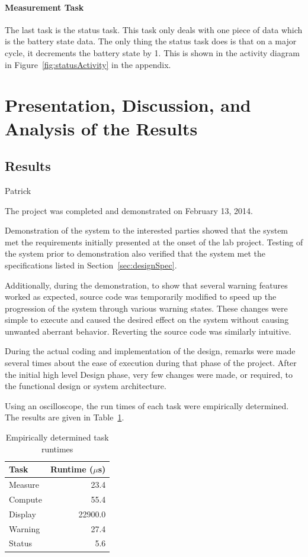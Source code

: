 \documentclass[12pt]{article} %
\begin{document}
    \paragraph{Measurement Task}
    The last task is the status task. This task only deals with one piece of data
    which is the battery state data. The only thing the status task does is that on
    a major cycle, it decrements the battery state by 1. This is shown in the
    activity diagram in Figure~\ref{fig:statusActivity} in the appendix.

    \section{Presentation, Discussion, and Analysis of the Results}

    \subsection{Results} Patrick

    The project was completed and demonstrated on February 13, 2014.

    Demonstration of the system to the interested parties showed that the
    system met the requirements initially presented at the onset of the lab
    project.  Testing of the system prior to demonstration also verified that
    the system met the specifications listed in Section~\ref{sec:designSpec}.

    Additionally, during the demonstration, to show that several warning
    features worked as expected, source code was temporarily modified to speed
    up the progression of the system through various warning states. These
    changes were simple to execute and caused the desired effect on the system
    without causing unwanted aberrant behavior. Reverting the source code was
    similarly intuitive.

    During the actual coding and implementation of the design, remarks were
    made several times about the ease of execution during that phase of the
    project. After the initial high level Design phase, very few changes were
    made, or required, to the functional design or system architecture.

    Using an oscilloscope, the run times of each task were empirically
    determined. The results are given in Table~\ref{tab:taskRuntimes}.

    \begin{table}[h]
      \centering
      \begin{tabular}{|l|r|} 
	\hline
	Task & Runtime ($\mu$s) \\ \hline
	Measure & 23.4 \\ \hline
	Compute & 55.4 \\ \hline
	Display & 22900.0 \\ \hline
	Warning & 27.4 \\ \hline
	Status & 5.6 \\ \hline
      \end{tabular}
      \caption{Empirically determined task runtimes}
      \label{tab:taskRuntimes}
    \end{table}
\end{document}

